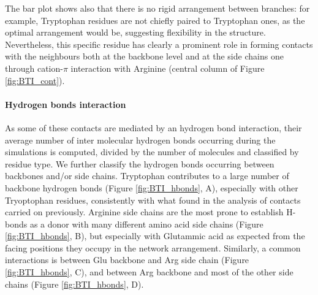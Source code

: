 The bar plot shows also that there is no rigid arrangement between branches: for example, Tryptophan residues are not chiefly paired to Tryptophan ones, as the optimal arrangement would be, suggesting flexibility in the structure.
%
Nevertheless, this specific residue has clearly a prominent role in forming contacts with the neighbours both at the backbone level and at the side chains one through cation-$\pi$ interaction with Arginine (central column of Figure \ref{fig:BTI_cont}).

\paragraph{Hydrogen bonds interaction} As some of these contacts are mediated by an hydrogen bond interaction, their average number of inter molecular hydrogen bonds occurring during the simulations is computed, divided by the number of molecules and classified by residue type.
We further classify the hydrogen bonds occurring between backbones and/or side chains. Tryptophan contributes to a large number of backbone hydrogen bonds (Figure \ref{fig:BTI_hbonds}, A), especially with other Tryoptophan residues, consistently with what found in the analysis of contacts carried on previously. Arginine side chains are the most prone to establish H-bonds as a donor with many different amino acid side chains (Figure \ref{fig:BTI_hbonds}, B), but especially with Glutammic acid as expected from the facing positions they occupy in the network arrangement.
%
Similarly, a common interactions is between Glu backbone and Arg side chain (Figure \ref{fig:BTI_hbonds}, C), and between Arg backbone and most of the other side chains (Figure \ref{fig:BTI_hbonds}, D).
